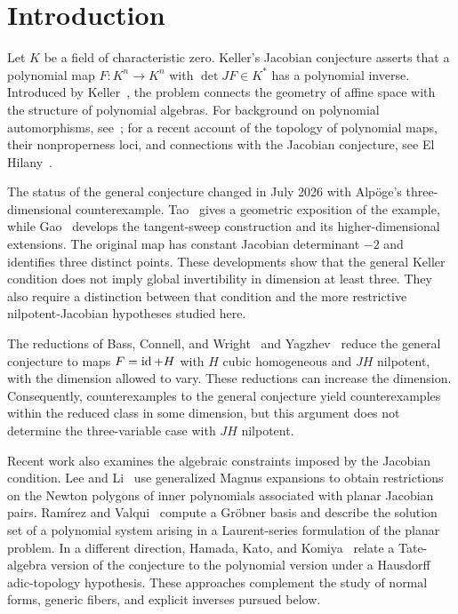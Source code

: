 \section{Introduction}\label{sec:introduction}

Let $K$ be a field of characteristic zero. Keller's Jacobian conjecture asserts that a polynomial map $F\colon K^n\to K^n$ with $\det JF\in K^*$ has a polynomial inverse. Introduced by Keller~\cite{Keller}, the problem connects the geometry of affine space with the structure of polynomial algebras. For background on polynomial automorphisms, see~\cite{EssenBook}; for a recent account of the topology of polynomial maps, their nonproperness loci, and connections with the Jacobian conjecture, see El Hilany~\cite{ElHilany2025}.

The status of the general conjecture changed in July 2026 with Alp\"oge's three-dimensional counterexample. Tao~\cite{Tao2026} gives a geometric exposition of the example, while Gao~\cite{Gao2026} develops the tangent-sweep construction and its higher-dimensional extensions. The original map has constant Jacobian determinant $-2$ and identifies three distinct points. These developments show that the general Keller condition does not imply global invertibility in dimension at least three. They also require a distinction between that condition and the more restrictive nilpotent-Jacobian hypotheses studied here.

The reductions of Bass, Connell, and Wright~\cite{BCW} and Yagzhev~\cite{Yagzhev} reduce the general conjecture to maps $F=\operatorname{id}+H$ with $H$ cubic homogeneous and $JH$ nilpotent, with the dimension allowed to vary. These reductions can increase the dimension. Consequently, counterexamples to the general conjecture yield counterexamples within the reduced class in some dimension, but this argument does not determine the three-variable case with $JH$ nilpotent.

Recent work also examines the algebraic constraints imposed by the Jacobian condition. Lee and Li~\cite{LeeLi2024} use generalized Magnus expansions to obtain restrictions on the Newton polygons of inner polynomials associated with planar Jacobian pairs. Ram\'irez and Valqui~\cite{RamirezValqui2025} compute a Gr\"obner basis and describe the solution set of a polynomial system arising in a Laurent-series formulation of the planar problem. In a different direction, Hamada, Kato, and Komiya~\cite{HamadaKatoKomiya2025} relate a Tate-algebra version of the conjecture to the polynomial version under a Hausdorff adic-topology hypothesis. These approaches complement the study of normal forms, generic fibers, and explicit inverses pursued below.

